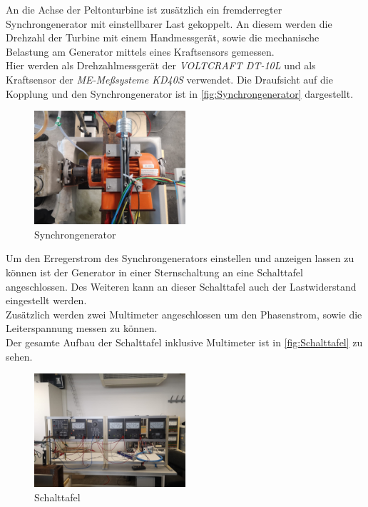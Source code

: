 An die Achse der Peltonturbine ist zusätzlich ein fremderregter Synchrongenerator mit einstellbarer Last gekoppelt.
An diesem werden die Drehzahl der Turbine mit einem Handmessgerät, sowie die mechanische Belastung am Generator mittels eines Kraftsensors gemessen.\\
Hier werden als Drehzahlmessgerät der \textit{VOLTCRAFT DT-10L} und als Kraftsensor der \textit{ME-Meßsysteme KD40S} verwendet.
Die Draufsicht auf die Kopplung und den Synchrongenerator ist in \autoref{fig:Synchrongenerator} dargestellt.\\

\begin{figure}[H]
    \centering
    \includegraphics[width=0.5\textwidth]{Abbildungen/Generator.jpeg}
    \caption{Synchrongenerator}
    \label{fig:Synchrongenerator}
\end{figure}

Um den Erregerstrom des Synchrongenerators einstellen und anzeigen lassen zu können ist der Generator in einer Sternschaltung an eine Schalttafel angeschlossen.
Des Weiteren kann an dieser Schalttafel auch der Lastwiderstand eingestellt werden.\\
Zusätzlich werden zwei Multimeter angeschlossen um den Phasenstrom, sowie die Leiterspannung messen zu können.\\
Der gesamte Aufbau der Schalttafel inklusive Multimeter ist in \autoref{fig:Schalttafel} zu sehen.

\begin{figure}[!ht]
    \centering
    \includegraphics[width=0.5\textwidth]{Abbildungen/Schalttafel.jpeg}
    \caption{Schalttafel}
    \label{fig:Schalttafel}
\end{figure}